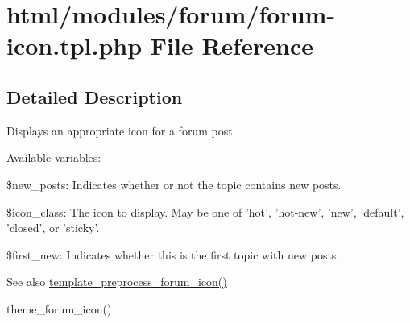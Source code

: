 \hypertarget{forum-icon_8tpl_8php}{
\section{html/modules/forum/forum-\/icon.tpl.php File Reference}
\label{forum-icon_8tpl_8php}
}


\subsection{Detailed Description}
Displays an appropriate icon for a forum post.

Available variables:
\begin{DoxyItemize}
\item \$new\_\-posts: Indicates whether or not the topic contains new posts.
\item \$icon\_\-class: The icon to display. May be one of 'hot', 'hot-\/new', 'new', 'default', 'closed', or 'sticky'.
\item \$first\_\-new: Indicates whether this is the first topic with new posts.
\end{DoxyItemize}

\begin{DoxySeeAlso}{See also}
\hyperlink{forum_8module_a5678a953a46d6c5f19c1322178d73bf1}{template\_\-preprocess\_\-forum\_\-icon()} 

theme\_\-forum\_\-icon() 
\end{DoxySeeAlso}
